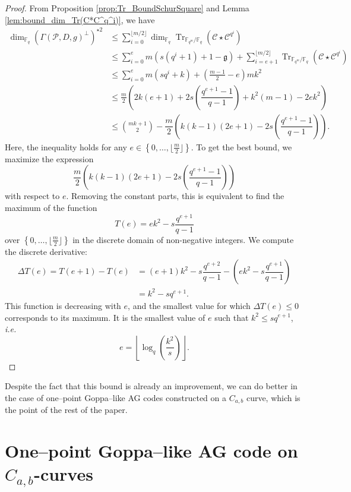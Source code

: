 \documentclass[a4paper]{article}
\theoremstyle{definition}
\theoremstyle{remark}
\newcommand{\calP}{\mathcal{P}}
\newcommand{\calC}{\mathcal{C}}
\newcommand{\fq}{\mathbb{F}_{q}}
\newcommand{\Tr}[1]{\operatorname{Tr}_{\mathbb{F}_{q^m}/\fq}\left(#1\right)}
\newcommand{\set}[1]{\left\{#1\right\}}
\begin{document}
\begin{proof}
    From Proposition \ref{prop:Tr_BoundSchurSquare} and Lemma \ref{lem:bound_dim_Tr(C*C^q^i)}, we have 
    \begin{align*}
        \dim_{\fq}(\Gamma(\calP,D,g)^{\perp})^{\star 2}
        & \leq \sum\limits_{i=0}^{\lfloor m/2 \rfloor} \dim_{\fq} \Tr{\calC \star \calC^{q^i}} \\
        & \leq \sum\limits_{i=0}^{e} m(s(q^i+1)+1-\mathfrak{g})  + \sum\limits_{i=e+1}^{\lfloor m/2 \rfloor} \Tr{\calC \star \calC^{q^i}} \\
        & \leq \sum\limits_{i=0}^{e} m(sq^i+k) + \left( \frac{m-1}{2} -e \right)mk^2 \\
        & \leq \frac{m}{2}\left(2k(e+1)+2s\left(\dfrac{q^{e+1}-1}{q-1}\right)+k^2(m-1)-2ek^2  \right) \\
        & \leq \binom{mk+1}{2} -  \dfrac{m}{2}\left(k(k-1)(2e+1)-2s\left(\dfrac{q^{e+1}-1}{q-1}\right)\right).
    \end{align*}
Here, the inequality holds for any $e \in \set{0,\dots,\lfloor \frac{m}{2} \rfloor}$. To get the best bound, we maximize the expression $$ \dfrac{m}{2}\left(k(k-1)(2e+1)-2s\left(\dfrac{q^{e+1}-1}{q-1}\right)\right)$$ with respect to $e$. Removing the constant parts, this is equivalent to find the maximum of the function
$$T(e) = ek^2-s\dfrac{q^{e+1}}{q-1}$$
over $\set{0,\dots,\lfloor \frac{m}{2} \rfloor}$ in the discrete domain of non-negative integers.  
We compute the discrete derivative:
\begin{align*}
    \Delta T(e) = T(e+1)-T(e) &= (e+1)k^2-s\dfrac{q^{e+2}}{q-1} - \left(ek^2-s\dfrac{q^{e+1}}{q-1}\right) \\
                              &= k^2 - sq^{e+1}.
\end{align*}
This function is decreasing with $e$, and the smallest value for which $\Delta T(e) \leq 0$ corresponds to its maximum. It is the smallest value of $e$ such that $k^2 \leq sq^{e+1}$, \emph{i.e.}
$$e =  \left\lfloor \log_q\left(\dfrac{k^2}{s}\right)\right\rfloor.$$
\end{proof}

Despite the fact that this bound is already an improvement, we can do better in the case of one--point Goppa--like AG codes constructed on a $C_{a,b}$ curve, which is the point of the rest of the paper.

\section{One--point Goppa--like AG code on $C_{a,b}$-curves}
\end{document}
